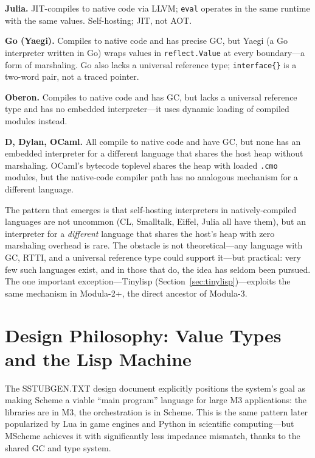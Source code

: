 \documentclass[11pt]{article}
\begin{document}
\textbf{Julia.}  JIT-compiles to native code via LLVM; \texttt{eval}
operates in the same runtime with the same values.  Self-hosting; JIT,
not AOT.

\textbf{Go (Yaegi).}  Compiles to native code and has precise GC, but
Yaegi (a Go interpreter written in Go) wraps values in
\texttt{reflect.Value} at every boundary---a form of marshaling.  Go
also lacks a universal reference type; \texttt{interface\{\}} is a
two-word pair, not a traced pointer.

\textbf{Oberon.}  Compiles to native code and has GC, but lacks a
universal reference type and has no embedded interpreter---it uses
dynamic loading of compiled modules instead.

\textbf{D, Dylan, OCaml.}  All compile to native code and have GC,
but none has an embedded interpreter for a different language that
shares the host heap without marshaling.  OCaml's bytecode toplevel
shares the heap with loaded \texttt{.cmo} modules, but the
native-code compiler path has no analogous mechanism for a different
language.

The pattern that emerges is that self-hosting interpreters in
natively-compiled languages are not uncommon (CL, Smalltalk, Eiffel,
Julia all have them), but an interpreter for a \emph{different}
language that shares the host's heap with zero marshaling overhead is
rare.  The obstacle is not theoretical---any language with GC, RTTI,
and a universal reference type could support it---but practical: very
few such languages exist, and in those that do, the idea has seldom
been pursued.  The one important exception---Tinylisp
(Section~\ref{sec:tinylisp})---exploits the same mechanism in
Modula-2+, the direct ancestor of Modula-3.


\section{Design Philosophy: Value Types and the Lisp Machine}
\label{sec:philosophy}

The SSTUBGEN.TXT design document explicitly positions the system's
goal as making Scheme a viable ``main program'' language for large M3
applications: the libraries are in M3, the orchestration is in Scheme.
This is the same pattern later popularized by Lua in game engines and
Python in scientific computing---but MScheme achieves it with
significantly less impedance mismatch, thanks to the shared GC and
type system.
\end{document}
